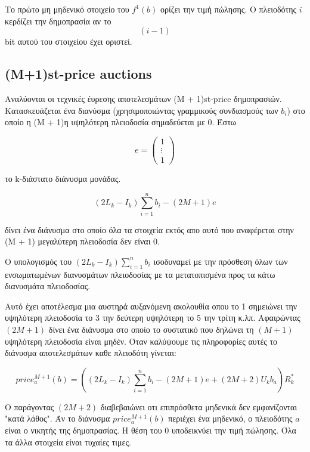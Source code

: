 \documentclass[a4paper,11pt]{article}
\begin{document}
Το πρώτο μη μηδενικό στοιχείο του $f^1(b)$ ορίζει την τιμή πώλησης. Ο πλειοδότης $i$ κερδίζει την δημοπρασία αν το $$(i − 1)$$ bit αυτού του
στοιχείου έχει οριστεί.

\subsection{(M+1)st-price auctions} Αναλύονται οι τεχνικές έυρεσης αποτελεσμάτων (M + 1)st-price δημοπρασιών. Κατασκευάζεται ένα διανύσμα
(χρησιμοποιώντας γραμμικούς συνδιασμούς των $b_i$) στο οποίο η (M + 1)η υψηλότερη πλειοδοσία σημαδεύεται με 0. Έστω

\begin{displaymath}
	e = 
	\left ( \begin{array}{c}
		1 \\
		\vdots \\
		1
	\end{array} \right)
\end{displaymath}

το k-διάστατο διάνυσμα μονάδας.

\begin{displaymath}
	(2L_k - I_k) \sum_{i=1}^{n} b_i - (2M+1)e
\end{displaymath}

δίνει ένα διάνυσμα στο οποίο όλα τα στοιχεία εκτός απο αυτό που αναφέρεται στην (M + 1) μεγαλύτερη πλειοδοσία δεν είναι 0.

Ο υπολογισμός του $(2L_k − I_k) \sum_{i=1}^{n} b_i$ ισοδυναμεί με την πρόσθεση όλων των ενσωματωμένων διανυσμάτων πλειοδοσίας με τα μετατοπισμένα
προς τα κάτω διανυσμάτα πλειοδοσίας.

Αυτό έχει αποτέλεσμα μια αυστηρά αυξανόμενη ακολουθία οπου το 1 σημειώνει την υψηλότερη πλειοδοσία το 3 την δεύτερη υψηλότερη το 5 την τρίτη κ.λπ.
Αφαιρώντας $(2M+1)$ δίνει ένα διάνυσμα στο οποίο το συστατικό που δηλώνει τη $(M + 1)$ υψηλότερη πλειοδοσία είναι μηδέν. Όταν καλύψουμε τις
πληροφορίες αυτές το διάνυσμα αποτελεσμάτων καθε πλειοδότη γίνεται:

\begin{displaymath}
	price_{a}^{M+1}(b) = \left ( (2L_k - I_k) \sum_{i=1}^{n} b_i - (2M+1)e + (2M+2)U_kb_a \right ) R^*_k
\end{displaymath}

Ο παράγοντας $(2M+2)$ διαβεβαιώνει οτι επιπρόσθετα μηδενικά δεν εμφανίζονται "κατά λάθος". Άν το διάνυσμα $price_{a}^{M+1}(b)$ περιέχει ένα
μηδενικό, ο πλειοδότης $a$ είναι ο νικητής της δημοπρασίας. Η θέση του 0 υποδεικνύει την τιμή πώλησης. Όλα τα άλλα στοιχεία είναι τυχαίες τιμες.
\end{document}

